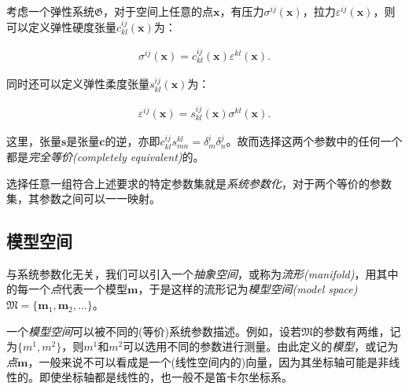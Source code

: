 \begin{example}
  考虑一个弹性系统$\mathfrak{G}$，对于空间上任意的点$\mathbf{x}$，有压力$\sigma^{ij}(\mathbf{x})$，拉力$\varepsilon^{ij}(\mathbf{x})$，则可以定义弹性硬度张量$c^{ij}_{kl}(\mathbf{x})$为：
  
  \begin{align} \label{fml:c1:stiffness}
    \sigma^{ij}(\mathbf{x}) = c^{ij}_{kl}(\mathbf{x}) \varepsilon^{kl}(\mathbf{x}).
  \end{align}
  
  同时还可以定义弹性柔度张量$s^{ij}_{kl}(\mathbf{x})$为：
  
  \begin{align} \label{fml:c1:compliance}
    \varepsilon^{ij}(\mathbf{x}) = s^{ij}_{kl}(\mathbf{x}) \sigma^{kl}(\mathbf{x}).
  \end{align}
  
  这里，张量$\mathbf{s}$是张量$\mathbf{c}$的逆，亦即$c^{ij}_{kl}s^{kl}_{mn}=\delta^{i}_{m}\delta^{j}_{n}$。故而选择这两个参数中的任何一个都是\emph{完全等价(completely equivalent)}的。
\end{example}

选择任意一组符合上述要求的特定参数集就是\emph{系统参数化}，对于两个等价的参数集，其参数之间可以一一映射。

\subsection{模型空间} \label{sec:c1:modelspace}

与系统参数化无关，我们可以引入一个\emph{抽象空间}，或称为\emph{流形(manifold)}，用其中的每一个\emph{点}代表一个模型$\mathbf{m}$，于是这样的流形记为\emph{模型空间(model space)}~$\mathfrak{M}=\{\mathbf{m}_1,\mathbf{m}_2,\ldots\}$。

一个\emph{模型空间}可以被不同的(等价)系统参数描述。例如，设若$\mathfrak{M}$的参数有两维，记为$\{m^1, m^2\}$，则$m^1$和$m^2$可以选用不同的参数进行测量。由此定义的\emph{模型}，或记为\emph{点}$\mathbf{m}$，一般来说不可以看成是一个(线性空间内的)向量，因为其坐标轴可能是非线性的。即使坐标轴都是线性的，也一般不是笛卡尔坐标系。


